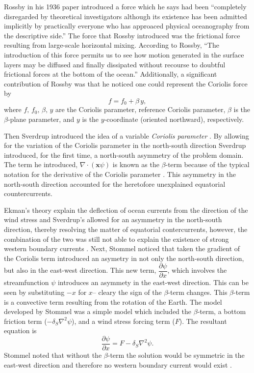 Rossby in his 1936 paper\cite{Rossby1936} introduced a force which he says had
been ``completely disregarded by theoretical investigators although its
existence has been admitted implicitly by practically everyone who has approaced
physical oceanography from the descriptive side.'' The force that Rossby
introduced was the frictional force resulting from large-scale horizontal
mixing. According to Rossby, ``The introduction of this force permits us to see
how motion generated in the surface layers may be diffused and finally
dissipated without recourse to doubtful frictional forces at the bottom of the
ocean.'' Additionally, a significant contribution of Rossby was that he noticed
one could represent the Coriolis force by \cite{James2009}
\begin{equation}
  f = f_0 + \beta\, y,
  \label{eqn:CoriolisParameterization}
\end{equation}
where $f,\, f_0,\, \beta,\, y$ are the Coriolis parameter, reference Coriolis
parameter, $\beta$ is the $\beta$-plane parameter, and $y$ is the $y$-coordinate
(oriented northward), respectively.

Then Sverdrup introduced the idea of a variable \emph{Coriolis parameter}
\cite{Fox-Kemper2003}. By allowing for the variation of the Coriolis parameter
in the north-south direction Sverdrup\cite{Sverdrup1947} introduced, for the
first time, a north-south asymmetry of the problem domain. The term he
introduced, $\nabla \cdot (\mathbf{x} \psi)$ is known as the $\beta$-term
because of the typical notation for the derivative of the Coriolis parameter
\cite{Fox-Kemper2003}. This asymmetry in the north-south direction accounted for
the heretofore unexplained equatorial countercurrents.

Ekman's theory explain the deflection of ocean currents from the direction of
the wind stress and Sverdrup's allowed for an asymmetry in the north-south
direction, thereby resolving the matter of equatorial contercurrents, however,
the combination of the two was still not able to explain the existence of strong
western boundary currents \cite{Fox-Kemper2003}.  Next,
Stommel\cite{Stommel1948} noticed that taken the gradient of the Coriolis term
introduced an asymetry in not only the north-south direction, but also in the
east-west direction. This new term, $\dfrac{\partial \psi}{\partial x}$, which
involves the streamfunction $\psi$ introduces an asymmety in the east-west
direction. This can be seen by substituting $-x$ for $x$-- cleary the sign of
the $\beta$-term changes. This $\beta$-term is a convective term resulting from
the rotation of the Earth. The model developed by Stommel was a simple model
which included the $\beta$-term, a bottom friction term ($-\delta_S \nabla^2
\psi$), and a wind stress forcing term ($F$).  The resultant equation
is \cite{Fox-Kemper2003,Stommel1948,Vallis06}
\begin{equation} \frac{\partial
  \psi}{\partial x} = F - \delta_S \nabla^2 \psi.
  \label{eqn:StommelModel}
\end{equation}
Stommel noted that without the $\beta$-term the solution would be
symmetric in the east-west direction and therefore no western boundary current
would exist \cite{Stommel1948}.


